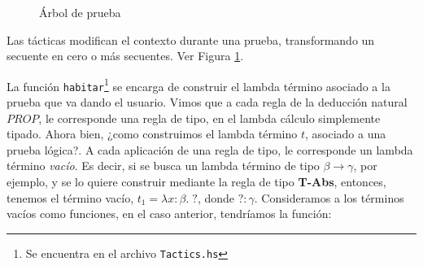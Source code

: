 \documentclass[a4paper,11pt]{article}
\theoremstyle{definition}
\theoremstyle{remark}
\begin{document}
\begin{figure}[!h]
  \centering
  \caption{Árbol de prueba} \label{arbol}
\end{figure}

Las tácticas modifican el contexto durante una prueba, transformando un secuente en cero o más secuentes. Ver Figura \ref{arbol}.

La función \texttt{habitar}\footnote{Se encuentra en el archivo \texttt{Tactics.hs}} se encarga de construir el lambda término asociado 
a la prueba que va dando el usuario.
Vimos que a cada regla de la deducción natural $PROP$, le corresponde una regla de tipo, en el lambda cálculo simplemente
tipado. Ahora bien, ¿como construimos el lambda término $t$, asociado a una prueba lógica?.
A cada aplicación de una regla de tipo, le corresponde un lambda término \textit{vacío}.
Es decir, si se busca un lambda término de tipo $\beta \rightarrow \gamma$, por ejemplo, y se lo quiere construir mediante la regla 
de tipo \textbf{T-Abs}, entonces, tenemos el término vacío, $t_{1} = \lambda x:\beta. \; ?$, donde $? : \gamma$.
Consideramos a los términos vacíos como funciones, en el caso anterior, tendríamos la función:
\end{document}
